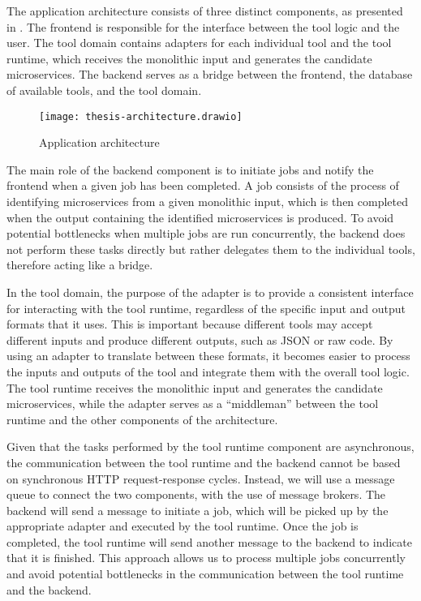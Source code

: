 The application architecture consists of three distinct components, as
presented in . The frontend is responsible for the
interface between the tool logic and the user. The tool domain contains
adapters for each individual tool and the tool runtime, which receives the
monolithic input and generates the candidate microservices. The backend serves
as a bridge between the frontend, the database of available tools, and the tool
domain.

\begin{figure*}[!htb]
  \centering
  \texttt{[image: thesis-architecture.drawio]}
  \caption{Application architecture}
  \label{fig:tool-architecture}
\end{figure*}

The main role of the backend component is to initiate jobs and notify the
frontend when a given job has been completed. A job consists of the process of
identifying microservices from a given monolithic input, which is then
completed when the output containing the identified microservices is produced.
To avoid potential bottlenecks when multiple jobs are run concurrently, the
backend does not perform these tasks directly but rather delegates them to the
individual tools, therefore acting like a bridge.

In the tool domain, the purpose of the adapter is to provide a consistent
interface for interacting with the tool runtime, regardless of the specific
input and output formats that it uses. This is important because different
tools may accept different inputs and produce different outputs, such as JSON
or raw code. By using an adapter to translate between these formats, it becomes
easier to process the inputs and outputs of the tool and integrate them with
the overall tool logic. The tool runtime receives the monolithic input and
generates the candidate microservices, while the adapter serves as a
``middleman'' between the tool runtime and the other components of the
architecture.

Given that the tasks performed by the tool runtime component are asynchronous,
the communication between the tool runtime and the backend cannot be based on
synchronous HTTP request-response cycles. Instead, we will use a message queue
to connect the two components, with the use of message brokers. The backend
will send a message to initiate a job, which will be picked up by the
appropriate adapter and executed by the tool runtime. Once the job is
completed, the tool runtime will send another message to the backend to
indicate that it is finished. This approach allows us to process multiple jobs
concurrently and avoid potential bottlenecks in the communication between the
tool runtime and the backend.
